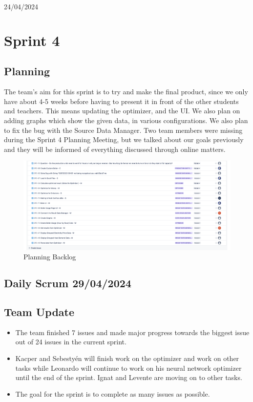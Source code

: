\documentclass[12pt]{report}
\begin{document}
\hfill 24/04/2024







\section{Sprint 4}
\subsection*{Planning}
The team's aim for this sprint is to try and make the final product, since we only have about 4-5 weeks before having to present it in front of the other students and teachers. This means updating the optimizer, and the UI. We also plan on adding graphs which show the given data, in various configurations. We also plan to fix the bug with the Source Data Manager. Two team members were missing during the Sprint 4 Planning Meeting, but we talked about our goals previously and they will be informed of everything discussed through online matters.

\begin{figure}[H]
  \centering
  \includegraphics[width=1\textwidth]{Resources/4-Sprint/Planning/Jira.png}
  \caption{Planning Backlog}
  \label{fig:S4Planning-image}
\end{figure}


\subsection*{Daily Scrum 29/04/2024}
\subsection*{Team Update}
\begin{itemize}
    \item The team finished 7 issues and made major progress towards the biggest issue out of 24 issues in the current sprint.
    \item Kacper and Sebestyén will finish work on the optimizer and work on other tasks while Leonardo will continue to work on his neural network optimizer until the end of the sprint. Ignat and Levente are moving on to other tasks.
    \item The goal for the sprint is to complete as many issues as possible.
\end{itemize}
\end{document}
